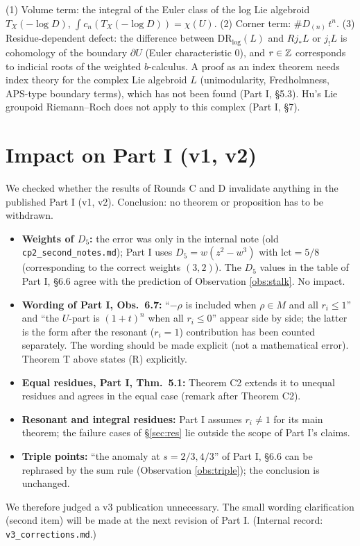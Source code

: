 \begin{obs}
(1) Volume term: the integral of the Euler class of the log Lie algebroid $T_X(-\log D)$, $\int c_n(T_X(-\log D))=\chi(U)$. (2) Corner term: $\#D_{(n)}\,t^n$. (3) Residue-dependent defect: the difference between $\mathrm{DR}_{\log}(L)$ and $Rj_*L$ or $j_!L$ is cohomology of the boundary $\partial U$ (Euler characteristic $0$), and $r\in\mathbb Z$ corresponds to indicial roots of the weighted $b$-calculus. A proof as an index theorem needs index theory for the complex Lie algebroid $L$ (unimodularity, Fredholmness, APS-type boundary terms), which has not been found (Part I, \S5.3). Hu's Lie groupoid Riemann--Roch does not apply to this complex (Part I, \S7).
\end{obs}

\section{Impact on Part I (v1, v2)}\label{sec:chk}
We checked whether the results of Rounds C and D invalidate anything in the published Part I (v1, v2). Conclusion: no theorem or proposition has to be withdrawn.

\begin{itemize}
\item \textbf{Weights of $D_5$:} the error was only in the internal note (old \texttt{cp2\_second\_notes.md}); Part I uses $D_5=w(z^2-w^3)$ with $\mathrm{lct}=5/8$ (corresponding to the correct weights $(3,2)$). The $D_5$ values in the table of Part I, \S6.6 agree with the prediction of Observation \ref{obs:stalk}. No impact.\tV
\item \textbf{Wording of Part I, Obs.\ 6.7:} ``$-\rho$ is included when $\rho\in M$ and all $r_i\le1$'' and ``the $U$-part is $(1+t)^n$ when all $r_i\le0$'' appear side by side; the latter is the form after the resonant ($r_i=1$) contribution has been counted separately. The wording should be made explicit (not a mathematical error). Theorem T above states (R) explicitly.
\item \textbf{Equal residues, Part I, Thm.\ 5.1:} Theorem C2 extends it to unequal residues and agrees in the equal case (remark after Theorem C2).
\item \textbf{Resonant and integral residues:} Part I assumes $r_i\ne1$ for its main theorem; the failure cases of \S\ref{sec:res} lie outside the scope of Part I's claims.
\item \textbf{Triple points:} ``the anomaly at $s=2/3,4/3$'' of Part I, \S6.6 can be rephrased by the sum rule (Observation \ref{obs:triple}); the conclusion is unchanged.
\end{itemize}
We therefore judged a v3 publication unnecessary. The small wording clarification (second item) will be made at the next revision of Part I. (Internal record: \texttt{v3\_corrections.md}.)

